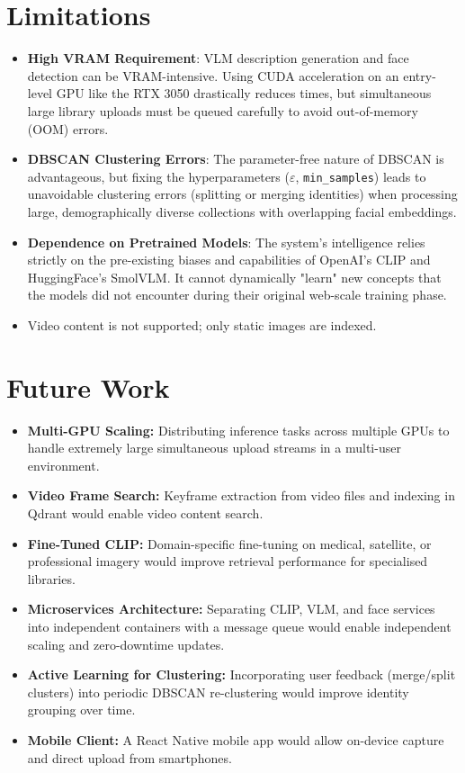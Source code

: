 \documentclass[12pt,a4paper,oneside]{report}
\begin{document}
\section{Limitations}
\begin{itemize}[leftmargin=*]
  \item \textbf{High VRAM Requirement}: VLM description generation and face detection
        can be VRAM-intensive. Using CUDA acceleration on an entry-level GPU like the
        RTX 3050 drastically reduces times, but simultaneous large library uploads
        must be queued carefully to avoid out-of-memory (OOM) errors.
  \item \textbf{DBSCAN Clustering Errors}: The parameter-free nature of DBSCAN
        is advantageous, but fixing the hyperparameters ($\varepsilon$, \texttt{min\_samples})
        leads to unavoidable clustering errors (splitting or merging identities) when processing
        large, demographically diverse collections with overlapping facial embeddings.
  \item \textbf{Dependence on Pretrained Models}: The system's intelligence relies
        strictly on the pre-existing biases and capabilities of OpenAI's CLIP and
        HuggingFace's SmolVLM. It cannot dynamically "learn" new concepts that the 
        models did not encounter during their original web-scale training phase.
  \item Video content is not supported; only static images are indexed.
\end{itemize}

\section{Future Work}
\begin{itemize}[leftmargin=*]
  \item \textbf{Multi-GPU Scaling:} Distributing inference tasks across multiple
        GPUs to handle extremely large simultaneous upload streams in a multi-user environment.
  \item \textbf{Video Frame Search:} Keyframe extraction from video files
        and indexing in Qdrant would enable video content search.
  \item \textbf{Fine-Tuned CLIP:} Domain-specific fine-tuning on
        medical, satellite, or professional imagery would improve
        retrieval performance for specialised libraries.
  \item \textbf{Microservices Architecture:} Separating CLIP, VLM, and
        face services into independent containers with a message queue
        would enable independent scaling and zero-downtime updates.
  \item \textbf{Active Learning for Clustering:} Incorporating user
        feedback (merge/split clusters) into periodic DBSCAN
        re-clustering would improve identity grouping over time.
  \item \textbf{Mobile Client:} A React Native mobile app would allow
        on-device capture and direct upload from smartphones.
\end{itemize}
\end{document}
